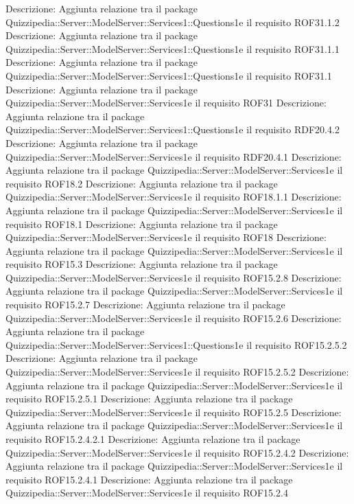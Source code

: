 Descrizione: Aggiunta relazione tra il package Quizzipedia::Server::ModelServer::Services1::Questions1e il requisito ROF31.1.2 
Descrizione: Aggiunta relazione tra il package Quizzipedia::Server::ModelServer::Services1::Questions1e il requisito ROF31.1.1 
Descrizione: Aggiunta relazione tra il package Quizzipedia::Server::ModelServer::Services1::Questions1e il requisito ROF31.1 
Descrizione: Aggiunta relazione tra il package Quizzipedia::Server::ModelServer::Services1e il requisito ROF31 
Descrizione: Aggiunta relazione tra il package Quizzipedia::Server::ModelServer::Services1::Questions1e il requisito RDF20.4.2 
Descrizione: Aggiunta relazione tra il package Quizzipedia::Server::ModelServer::Services1e il requisito RDF20.4.1 
Descrizione: Aggiunta relazione tra il package Quizzipedia::Server::ModelServer::Services1e il requisito ROF18.2 
Descrizione: Aggiunta relazione tra il package Quizzipedia::Server::ModelServer::Services1e il requisito ROF18.1.1 
Descrizione: Aggiunta relazione tra il package Quizzipedia::Server::ModelServer::Services1e il requisito ROF18.1 
Descrizione: Aggiunta relazione tra il package Quizzipedia::Server::ModelServer::Services1e il requisito ROF18 
Descrizione: Aggiunta relazione tra il package Quizzipedia::Server::ModelServer::Services1e il requisito ROF15.3 
Descrizione: Aggiunta relazione tra il package Quizzipedia::Server::ModelServer::Services1e il requisito ROF15.2.8 
Descrizione: Aggiunta relazione tra il package Quizzipedia::Server::ModelServer::Services1e il requisito ROF15.2.7 
Descrizione: Aggiunta relazione tra il package Quizzipedia::Server::ModelServer::Services1e il requisito ROF15.2.6 
Descrizione: Aggiunta relazione tra il package Quizzipedia::Server::ModelServer::Services1::Questions1e il requisito ROF15.2.5.2 
Descrizione: Aggiunta relazione tra il package Quizzipedia::Server::ModelServer::Services1e il requisito ROF15.2.5.2 
Descrizione: Aggiunta relazione tra il package Quizzipedia::Server::ModelServer::Services1e il requisito ROF15.2.5.1 
Descrizione: Aggiunta relazione tra il package Quizzipedia::Server::ModelServer::Services1e il requisito ROF15.2.5 
Descrizione: Aggiunta relazione tra il package Quizzipedia::Server::ModelServer::Services1e il requisito ROF15.2.4.2.1 
Descrizione: Aggiunta relazione tra il package Quizzipedia::Server::ModelServer::Services1e il requisito ROF15.2.4.2 
Descrizione: Aggiunta relazione tra il package Quizzipedia::Server::ModelServer::Services1e il requisito ROF15.2.4.1 
Descrizione: Aggiunta relazione tra il package Quizzipedia::Server::ModelServer::Services1e il requisito ROF15.2.4 
